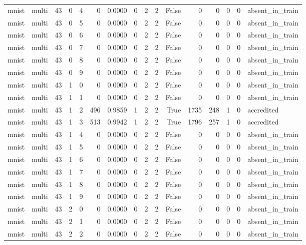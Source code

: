 \begin{tabular}{llrrrrrrrrrrrrrl}
mnist & multi & 43 & 0 & 4 & 0 & 0.0000 & 0 & 2 & 2 & False & 0 & 0 & 0 & 0 & absent\_in\_train \\
mnist & multi & 43 & 0 & 5 & 0 & 0.0000 & 0 & 2 & 2 & False & 0 & 0 & 0 & 0 & absent\_in\_train \\
mnist & multi & 43 & 0 & 6 & 0 & 0.0000 & 0 & 2 & 2 & False & 0 & 0 & 0 & 0 & absent\_in\_train \\
mnist & multi & 43 & 0 & 7 & 0 & 0.0000 & 0 & 2 & 2 & False & 0 & 0 & 0 & 0 & absent\_in\_train \\
mnist & multi & 43 & 0 & 8 & 0 & 0.0000 & 0 & 2 & 2 & False & 0 & 0 & 0 & 0 & absent\_in\_train \\
mnist & multi & 43 & 0 & 9 & 0 & 0.0000 & 0 & 2 & 2 & False & 0 & 0 & 0 & 0 & absent\_in\_train \\
mnist & multi & 43 & 1 & 0 & 0 & 0.0000 & 0 & 2 & 2 & False & 0 & 0 & 0 & 0 & absent\_in\_train \\
mnist & multi & 43 & 1 & 1 & 0 & 0.0000 & 0 & 2 & 2 & False & 0 & 0 & 0 & 0 & absent\_in\_train \\
mnist & multi & 43 & 1 & 2 & 496 & 0.9859 & 1 & 2 & 2 & True & 1735 & 248 & 1 & 0 & accredited \\
mnist & multi & 43 & 1 & 3 & 513 & 0.9942 & 1 & 2 & 2 & True & 1796 & 257 & 1 & 0 & accredited \\
mnist & multi & 43 & 1 & 4 & 0 & 0.0000 & 0 & 2 & 2 & False & 0 & 0 & 0 & 0 & absent\_in\_train \\
mnist & multi & 43 & 1 & 5 & 0 & 0.0000 & 0 & 2 & 2 & False & 0 & 0 & 0 & 0 & absent\_in\_train \\
mnist & multi & 43 & 1 & 6 & 0 & 0.0000 & 0 & 2 & 2 & False & 0 & 0 & 0 & 0 & absent\_in\_train \\
mnist & multi & 43 & 1 & 7 & 0 & 0.0000 & 0 & 2 & 2 & False & 0 & 0 & 0 & 0 & absent\_in\_train \\
mnist & multi & 43 & 1 & 8 & 0 & 0.0000 & 0 & 2 & 2 & False & 0 & 0 & 0 & 0 & absent\_in\_train \\
mnist & multi & 43 & 1 & 9 & 0 & 0.0000 & 0 & 2 & 2 & False & 0 & 0 & 0 & 0 & absent\_in\_train \\
mnist & multi & 43 & 2 & 0 & 0 & 0.0000 & 0 & 2 & 2 & False & 0 & 0 & 0 & 0 & absent\_in\_train \\
mnist & multi & 43 & 2 & 1 & 0 & 0.0000 & 0 & 2 & 2 & False & 0 & 0 & 0 & 0 & absent\_in\_train \\
mnist & multi & 43 & 2 & 2 & 0 & 0.0000 & 0 & 2 & 2 & False & 0 & 0 & 0 & 0 & absent\_in\_train \\

\end{tabular}
